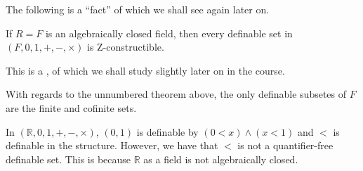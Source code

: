 \documentclass[notoc,notitlepage]{tufte-book}
\begin{document}
The following is a ``fact'' of which we shall see again later on.

\begin{thmnonum}
  If $R = F$ is an algebraically closed field, then every definable set in $(F, 0, 1, +, -, \times)$ is Z-constructible.
\end{thmnonum}

This is a , of which we shall study slightly later on in the course.

\begin{remark}
  With regards to the unnumbered theorem above, the only definable subsetes of $F$ are the finite and cofinite sets.
\end{remark}

\begin{eg}
  In $(\mathbb{R}, 0, 1, +, -, \times)$, $(0, 1)$ is definable by $(0 < x) \land (x < 1)$ and $<$ is definable in the structure. However, we have that $<$ is not a quantifier-free definable set. This is because $\mathbb{R}$ as a field is not algebraically closed.
\end{eg}




\appendix

\backmatter\

\pagestyle{plain}



\printindex
\end{document}
